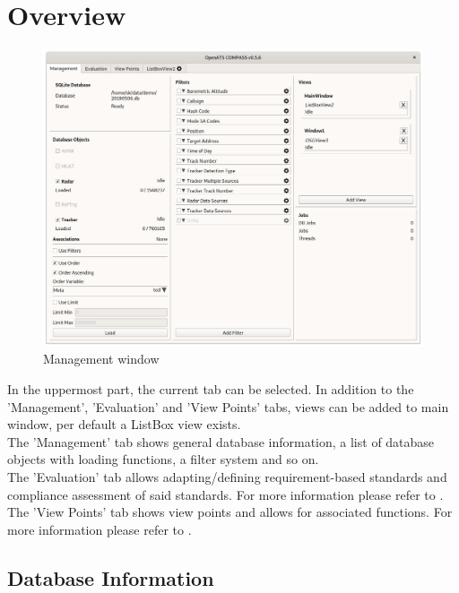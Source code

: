 \section{Overview}
\label{sec:management_overview}

\begin{figure}[H]
  \hspace*{-2.5cm}
    \includegraphics[width=19cm]{../screenshots/management.png}
  \caption{Management window}
\end{figure}

In the uppermost part, the current tab can be selected. In addition to the 'Management', 'Evaluation' and 'View Points' tabs, views can be added to main window, per default a ListBox view exists. \\

The 'Management' tab shows general database information, a list of database objects with loading functions, a filter system and so on. \\

The 'Evaluation' tab allows adapting/defining requirement-based standards  and compliance assessment of said standards. For more information please refer to . \\

The 'View Points' tab shows view points and allows for associated functions. For more information please refer to .

\subsection{Database Information}

